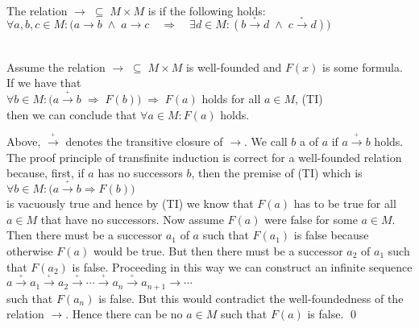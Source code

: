 \begin{Definition} \hspace*{\fill} \\
  The relation $\rightarrow \;\subseteq\; M \times M$ is  if the following holds:
  \\[0.2cm]
  \hspace*{1.3cm}
  $\forall a, b, c \in M: \bigl(a \rightarrow b \;\wedge\; a \rightarrow c \quad\Rightarrow\quad
   \exists d \in M: (b \stackrel{_*}{\rightarrow} d \;\wedge\; c \stackrel{_*}{\rightarrow} d)\bigr)
  $  \eox
\end{Definition}
\pagebreak

\begin{Theorem}
  \hspace*{\fill} \\
  Assume the relation $\rightarrow \;\subseteq\; M \times M$ is well-founded and $F(x)$ is some formula.
  If we have that
  \\[0.2cm]
  \hspace*{1.3cm}
  $\forall b \in M: \bigl( a \stackrel{_+}{\rightarrow} b \;\Rightarrow\; F(b)\bigr) \;\Rightarrow\; F(a)$ holds for all $a \in M$, \hspace*{\fill} (TI)
  \\[0.2cm]
  then we can conclude that $\forall a \in M: F(a)$ holds.
\end{Theorem}

\proof
Above, $\stackrel{_+}{\rightarrow}$ denotes the transitive closure of $\rightarrow$.  We call $b$ a  of $a$
if $a \stackrel{_+}{\rightarrow} b$ holds.  The proof principle of transfinite induction is correct for a well-founded
relation because, first, if $a$ has no successors $b$, then the premise of (TI) which is
\\[0.2cm]
\hspace*{1.3cm}
$\forall b \in M: \bigl( a \stackrel{_+}{\rightarrow} b \Rightarrow F(b)\bigr)$
\\[0.2cm]
is vacuously true and hence by (TI) we know that $F(a)$ has to be true for all $a \in M$ that have no
successors.  Now assume $F(a)$ were false for some $a \in M$.  Then there must be a successor $a_1$ of $a$ such
that $F(a_1)$ is false because otherwise $F(a)$ would be true.  But then there must be a successor $a_2$ of
$a_1$ such that $F(a_2)$ is false.  Proceeding in this way we can construct an infinite sequence
\\[0.2cm]
\hspace*{1.3cm}
$a \stackrel{_+}{\rightarrow} a_1 \stackrel{_+}{\rightarrow} a_2 \stackrel{_+}{\rightarrow} \cdots \stackrel{_+}{\rightarrow} a_n \stackrel{_+}{\rightarrow} a_{n+1} \rightarrow
\cdots
$
\\[0.2cm]
such that $F(a_n)$ is false.  But this would contradict the well-foundedness of the relation $\rightarrow$.  Hence there can be no $a \in M$
such that $F(a)$ is false. \qed

